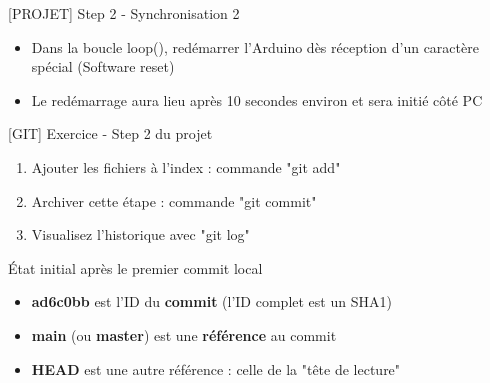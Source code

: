 \documentclass[a4paper,11pt]{beamer}
\newcounter{exampleBlockCounter}
\begin{document}
\begin{frame}
\begin{exampleblock}{[PROJET] Step 2 - Synchronisation 2}
\begin{itemize}
\item Dans la boucle loop(), redémarrer l'Arduino dès réception d'un caractère spécial (Software reset)
\item Le redémarrage aura lieu après 10 secondes environ et sera initié côté PC
\end{itemize}
\end{exampleblock}

\begin{exampleblock}{[GIT] Exercice  - Step 2 du projet} 
\begin{enumerate}
    \item Ajouter les fichiers à l'index : commande "git add"
    \item Archiver cette étape : commande "git commit"
    \item Visualisez l'historique avec "git log" 
\end{enumerate}
\end{exampleblock}
\end{frame}

\begin{frame}
\begin{block}{État initial après le premier commit local}
\centering
{}
\begin{itemize}
	\item \textbf{ad6c0bb} est l'ID du \textbf{commit} (l'ID complet est un SHA1)
	\item \textbf{main} (ou \textbf{master}) est une \textbf{référence} au commit
	\item \textbf{HEAD} est une autre référence : celle de la "tête de lecture"
\end{itemize}
\end{block}
\end{frame}
\end{document}
